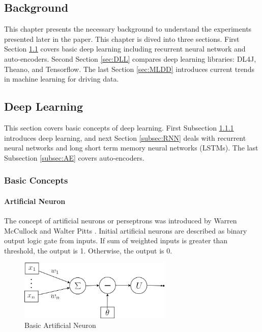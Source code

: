\documentclass[draft,dvipsnames]{drexel-thesis}
\begin{document}
\begin{thesis}
\chapter{Background}\label{chap:bg}
This chapter presents the necessary background to understand the experiments presented later in the paper. This chapter is dived into three sections. First Section \ref{sec:DL} covers basic deep learning including recurrent neural network and auto-encoders. Second Section \ref{sec:DLL} compares deep learning libraries: DL4J, Theano, and Tensorflow. The last Section \ref{sec:MLDD} introduces current trends in machine learning for driving data.

\section{Deep Learning}\label{sec:DL}
This section covers basic concepts of deep learning. First Subsection \ref{subsec:basicDL} introduces deep learning, and next Section \ref{subsec:RNN} deals with recurrent neural networks and long short term memory neural networks (LSTMs). The last Subsection \ref{subsec:AE} covers auto-encoders.

\subsection{Basic Concepts}\label{subsec:basicDL}

\subsubsection{Artificial Neuron}\label{subsubsec:AN}
The concept of artificial neurons or perseptrons was introduced by Warren McCullock and Walter Pitts \cite{raschka2015python}. Initial artificial neurons are described as binary output logic gate from inputs. If sum of weighted inputs is greater than threshold, the output is 1. Otherwise, the output is 0.

\begin{figure}[t!]
    \centering
    \includegraphics[width=0.65\textwidth]{pictures/figures/basic_AN.png}
    \caption{Basic Artificial Neuron}
    \label{fig:basic_AN}
\end{figure}


\end{thesis}
\end{document}
